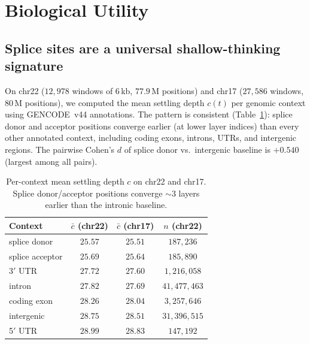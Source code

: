 \documentclass{article}
\theoremstyle{plain}
\theoremstyle{definition}
\theoremstyle{remark}
\begin{document}
\section{Biological Utility}
\label{sec:utility}

\subsection{Splice sites are a universal shallow-thinking signature}
\label{sec:splice}

On chr22 ($12{,}978$ windows of 6\,kb, $77.9$\,M positions) and chr17
($27{,}586$ windows, $80$\,M positions), we computed the mean settling
depth $c(t)$ per genomic context using GENCODE~v44 annotations. The
pattern is consistent (Table~\ref{tab:splice}): splice donor and
acceptor positions converge earlier (at lower layer indices) than every
other annotated context, including coding exons, introns, UTRs, and
intergenic regions. The pairwise Cohen's $d$ of splice donor vs.\
intergenic baseline is $+0.540$ (largest among all pairs).

\begin{table}[t]
\caption{Per-context mean settling depth $c$ on chr22 and chr17. Splice
donor/acceptor positions converge $\sim 3$ layers earlier than the
intronic baseline.}
\label{tab:splice}
\centering
\small
\begin{tabular}{@{}lccc@{}}
\toprule
Context & $\bar{c}$ (chr22) & $\bar{c}$ (chr17) & $n$ (chr22) \\
\midrule
splice donor    & $25.57$ & $25.51$ & $187{,}236$ \\
splice acceptor & $25.69$ & $25.64$ & $185{,}890$ \\
3$'$ UTR        & $27.72$ & $27.60$ & $1{,}216{,}058$ \\
intron          & $27.82$ & $27.69$ & $41{,}477{,}463$ \\
coding exon     & $28.26$ & $28.04$ & $3{,}257{,}646$ \\
intergenic      & $28.75$ & $28.51$ & $31{,}396{,}515$ \\
5$'$ UTR        & $28.99$ & $28.83$ & $147{,}192$ \\
\bottomrule
\end{tabular}
\end{table}
\end{document}
